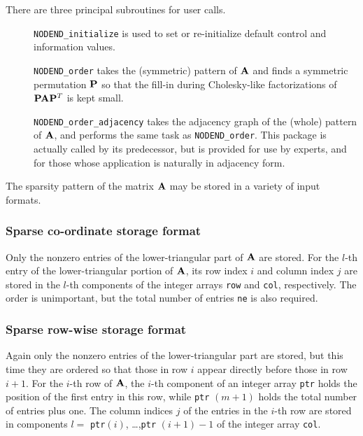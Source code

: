 \documentclass{galahad}
\newcommand{\packagename}{NODEND}
\begin{document}
\noindent There are three principal subroutines for user calls.

\begin{description}
\item[]{\tt \packagename\_initialize} is used to set or re-initialize 
 default control and information values.

\item[] {\tt \packagename\_order} takes the (symmetric) pattern of ${\mathbf{A}}$
 and finds a symmetric permutation ${\mathbf{P}}$ so that the fill-in
 during Cholesky-like factorizations of ${\mathbf{P}} {\mathbf{A}} {\mathbf{P}}^T$
 is kept small.

\item[] {\tt \packagename\_order\_adjacency} takes the adjacency graph of 
 the (whole) pattern of ${\mathbf{A}}$, and performs the same task as
 {\tt \packagename\_order}. This package is actually called
 by its predecessor, but is provided for use by experts, and for
 those whose application is naturally in adjacency form.
\end{description}


\galmatrix
The sparsity pattern of the matrix ${\mathbf{A}}$ may be stored in 
a variety of input formats.

\subsubsection{Sparse co-ordinate storage format}\label{coordinate}
Only the nonzero entries of the lower-triangular part of ${\mathbf{A}}$ are stored.
For the $l$-th entry of the lower-triangular portion of ${\mathbf{A}}$,
its row index $i$ and column index $j$
are stored in the $l$-th components of the integer arrays 
{\tt row} and {\tt col}, respectively.
The order is unimportant, but the total number of entries
{\tt ne} is also required.

\subsubsection{Sparse row-wise storage format}\label{rowwise}
Again only the nonzero entries of the lower-triangular part are stored,
but this time they are ordered so that those in row $i$ appear directly
before those in row $i+1$. For the $i$-th row of ${\mathbf{A}}$, the $i$-th component
of an integer array {\tt ptr} holds the position of the first entry in this row,
while {\tt ptr} $(m+1)$ holds the total number of entries plus one.
The column indices $j$ of the entries in the $i$-th row are 
stored in components $l =$ {\tt ptr}$(i)$, \ldots ,{\tt ptr} $(i+1)-1$ 
of the integer array {\tt col}.
\end{document}

